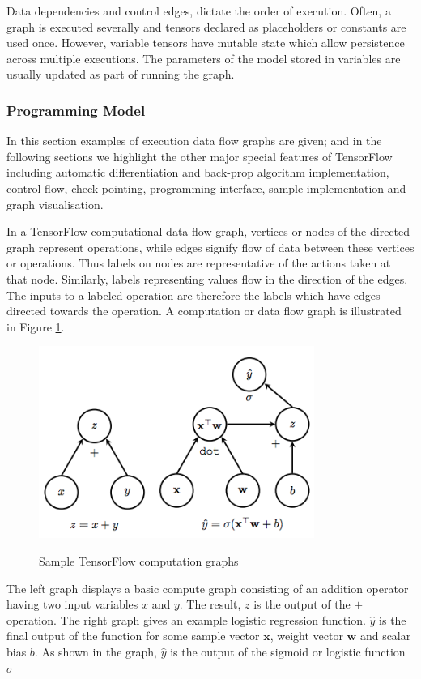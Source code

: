 Data dependencies and control edges, dictate the order of execution. Often, a graph is executed severally and tensors declared as placeholders or constants are used once. However, variable tensors have mutable state which allow persistence across multiple executions. The parameters of the model stored in variables are usually updated as part of running the graph.

\subsubsection{Programming Model}
In this section examples of execution data flow graphs are given; and in the following sections we highlight the other major special features of TensorFlow including automatic differentiation and back-prop algorithm implementation, control flow, check pointing, programming interface, sample implementation and graph visualisation.

In a TensorFlow computational data flow graph, vertices or nodes of the directed graph represent operations, while edges signify flow of data between these vertices or operations. Thus labels on nodes are representative of the actions taken at that node.  Similarly, labels representing values flow in the direction of the edges. The inputs to a labeled operation are therefore the labels which have edges directed towards the operation. A computation or data flow graph is illustrated in Figure \ref{fig_c3_tfg}. 
\begin{figure}
\centering
  \includegraphics[width=9cm]{thesis/images/tfgraph}\\
  \caption{Sample TensorFlow computation graphs\citep{goldsborough2016tour}}\label{fig_c3_tfg}
\end{figure}

The left graph displays a basic compute graph consisting of an addition operator having two input variables $x$ and $y$.  The result, $z$ is the output of the $+$ operation.  The right graph gives an example logistic regression function. $\hat{y}$ is the final output of the function for some sample vector $\mathbf{x}$, weight vector $\mathbf{w}$ and scalar bias $b$.  As shown in the graph, $\hat{y}$ is the output of the sigmoid or logistic function $\sigma$

